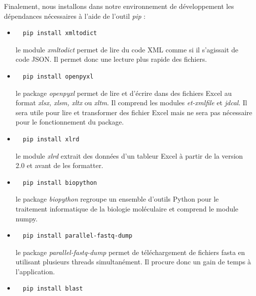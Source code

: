 \documentclass[twoside,a4paper,11pt,frenchb,openany]{report}
\begin{document}
Finalement, nous installons dans notre environnement de développement les dépendances nécessaires à l'aide de l'outil \textit{pip} :
\begin{itemize}
\item \begin{verbatim}  pip install xmltodict\end{verbatim}
le module \textit{xmltodict} permet de lire du code XML comme si il s'agissait de code JSON. Il permet donc une lecture plus rapide des fichiers.
\item  \begin{verbatim}  pip install openpyxl\end{verbatim}
le package \textit{openpyxl} permet de lire et d'écrire dans des fichiers Excel au format \textit{xlsx, xlsm, xltx} ou \textit{xltm}. Il comprend les modules \textit{et-xmlfile} et \textit{jdcal}. Il sera utile pour lire et transformer des fichier Excel mais ne sera pas nécessaire pour le fonctionnement du package.
\item  \begin{verbatim}  pip install xlrd\end{verbatim}
le module \textit{xlrd} extrait des données d'un tableur Excel à partir de la version 2.0 et avant de les formatter.
\item  \begin{verbatim}  pip install biopython\end{verbatim}
le package \textit{biopython} regroupe un ensemble d'outils Python pour le traitement informatique de la biologie moléculaire et comprend le module numpy.
\item \begin{verbatim}  pip install parallel-fastq-dump\end{verbatim}
le package \textit{parallel-fastq-dump} permet de téléchargement de fichiers fasta en utilisant plusieurs threads simultanément. Il procure donc un gain de temps à l'application.
\item \begin{verbatim}  pip install blast\end{verbatim}
\end{itemize}
\end{document}
